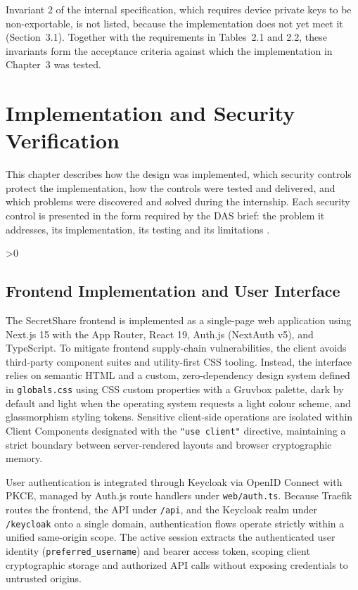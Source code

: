 \documentclass[12pt,a4paper]{article}
\numberwithin{equation}{section}
\numberwithin{figure}{section}
\numberwithin{table}{section}
\newcommand{\subsec}[1]{%
  \ifnum\value{subsection}>0\clearpage\fi
  \subsection{#1}%
}
\begin{document}
Invariant 2 of the internal specification, which requires device private keys to be non-exportable, is not listed, because the implementation does not yet meet it (Section~3.1). Together with the requirements in Tables~2.1 and 2.2, these invariants form the acceptance criteria against which the implementation in Chapter~3 was tested.

\clearpage
\section{Implementation and Security Verification}

This chapter describes how the design was implemented, which security controls protect the implementation, how the controls were tested and delivered, and which problems were discovered and solved during the internship. Each security control is presented in the form required by the DAS brief: the problem it addresses, its implementation, its testing and its limitations \cite{dasbrief}.

\subsec{Frontend Implementation and User Interface}

The SecretShare frontend is implemented as a single-page web application using Next.js 15 with the App Router, React 19, Auth.js (NextAuth v5), and TypeScript. To mitigate frontend supply-chain vulnerabilities, the client avoids third-party component suites and utility-first CSS tooling. Instead, the interface relies on semantic HTML and a custom, zero-dependency design system defined in \texttt{globals.css} using CSS custom properties with a Gruvbox palette, dark by default and light when the operating system requests a light colour scheme, and glassmorphism styling tokens. Sensitive client-side operations are isolated within Client Components designated with the \texttt{"use client"} directive, maintaining a strict boundary between server-rendered layouts and browser cryptographic memory.

User authentication is integrated through Keycloak via OpenID Connect with PKCE, managed by Auth.js route handlers under \texttt{web/auth.ts}. Because Traefik routes the frontend, the API under \texttt{/api}, and the Keycloak realm under \texttt{/keycloak} onto a single domain, authentication flows operate strictly within a unified same-origin scope. The active session extracts the authenticated user identity (\texttt{preferred\_username}) and bearer access token, scoping client cryptographic storage and authorized API calls without exposing credentials to untrusted origins.
\end{document}
